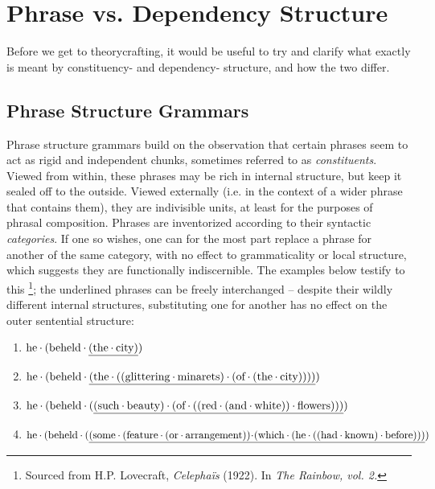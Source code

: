 \section{Phrase vs. Dependency Structure}
\label{section:phrase_vs_dependecy}
Before we get to theorycrafting, it would be useful to try and clarify what exactly is meant by constituency- and dependency- structure, and how the two differ.

\subsection{Phrase Structure Grammars}
Phrase structure grammars build on the observation that certain phrases seem to act as rigid and independent chunks, sometimes referred to as \textit{constituents}. 
Viewed from within, these phrases may be rich in internal structure, but keep it sealed off to the outside.
Viewed externally (i.e. in the context of a wider phrase that contains them), they are indivisible units, at least for the purposes of phrasal composition.
Phrases are inventorized according to their syntactic \textit{categories}.
If one so wishes, one can for the most part replace a phrase for another of the same category, with no effect to grammaticality or local structure, which suggests they are functionally indiscernible.
The examples below testify to this%
\footnote{Sourced from H.P. Lovecraft, \textit{Celepha\"{i}s}  (1922). In \textit{The Rainbow, vol. 2.}}; the underlined phrases can be freely interchanged -- despite their wildly different internal structures, substituting one for another has no effect on the outer sentential structure:

{\smaller%
\begin{enumerate}
\item $\text{he}\mkern-0.5mu\cdot\mkern-0.5mu (\text{beheld}\mkern-0.5mu\cdot\mkern-0.5mu \underline{(\text{the}\mkern-0.5mu\cdot\mkern-0.5mu \text{city})})$
\item $\text{he}\mkern-0.5mu\cdot\mkern-0.5mu (\text{beheld}\mkern-0.5mu\cdot\mkern-0.5mu \underline{(\text{the}\mkern-0.5mu\cdot\mkern-0.5mu ((\text{glittering}\mkern-0.5mu\cdot\mkern-0.5mu {\text{minarets}})\mkern-0.5mu\cdot\mkern-0.5mu (\text{of}\mkern-0.5mu\cdot\mkern-0.5mu (\text{the}\mkern-0.5mu\cdot\mkern-0.5mu \text{city}))))})$
\item $\text{he}\mkern-0.5mu\cdot\mkern-0.5mu (\text{beheld}\mkern-0.5mu\cdot\mkern-0.5mu (\underline{(\text{such}\mkern-0.5mu\cdot\mkern-0.5mu \text{beauty})\mkern-0.5mu\cdot\mkern-0.5mu (\text{of}\mkern-0.5mu\cdot\mkern-0.5mu ((\text{red}\mkern-0.5mu\cdot\mkern-0.5mu (\text{and}\mkern-0.5mu\cdot\mkern-0.5mu \text{white}))\mkern-0.5mu\cdot\mkern-0.5mu \text{flowers})))})$
\item $\text{he}\mkern-0.5mu\cdot\mkern-0.5mu (\text{beheld}\mkern-0.5mu\cdot\mkern-0.5mu (\underline{
	(
		\text{some}\mkern-0.5mu\cdot\mkern-0.5mu 
			(\text{feature}\mkern-0.5mu\cdot\mkern-0.5mu 
				(\text{or}\mkern-0.5mu\cdot\mkern-0.5mu \text{arrangement})
			)\!\mkern-0.5mu\cdot\mkern-0.5mu \!
			(\text{which}\mkern-0.5mu\cdot\mkern-0.5mu 
				(\text{he}\mkern-0.5mu\cdot\mkern-0.5mu 
					(
						(\text{had}\mkern-0.5mu\cdot\mkern-0.5mu \text{known})\mkern-0.5mu\cdot\mkern-0.5mu 
						\text{before}
					)					
				)
			)})$
\end{enumerate}}%

